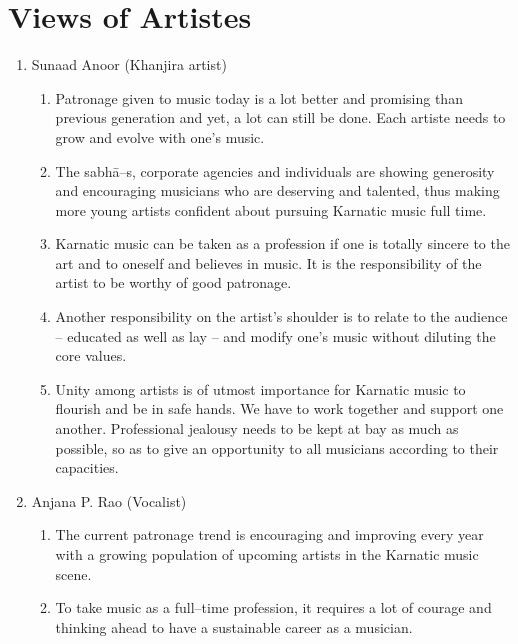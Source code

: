 \section*{Views of Artistes}

\begin{enumerate}
\item Sunaad Anoor (Khanjira artist)
 
\begin{enumerate}
\item Patronage given to music today is a lot better and promising than previous generation and yet, a lot can still be done. Each artiste needs to grow and evolve with one’s music.

 \item The sabhā–s, corporate agencies and individuals are showing generosity and encouraging musicians who are deserving and talented, thus making more young artists confident about pursuing Karnatic music full time.

 \item Karnatic music can be taken as a profession if one is totally sincere to the art and to oneself and believes in music. It is the responsibility of the artist to be worthy of good patronage.

 \item Another responsibility on the artist’s shoulder is to relate to the audience – educated as well as lay – and modify one’s music without diluting the core values.

 \item Unity among artists is of utmost importance for Karnatic music to flourish and be in safe hands. We have to work together and support one another. Professional jealousy needs to be kept at bay as much as possible, so as to give an opportunity to all musicians according to their capacities.
\end{enumerate}

 \item Anjana P. Rao (Vocalist)
 
\begin{enumerate}
\item The current patronage trend is encouraging and improving every year with a growing population of upcoming artists in the Karnatic music scene.

 \item To take music as a full–time profession, it requires a lot of courage and thinking ahead to have a sustainable career as a musician.


\end{enumerate}
\end{enumerate}
